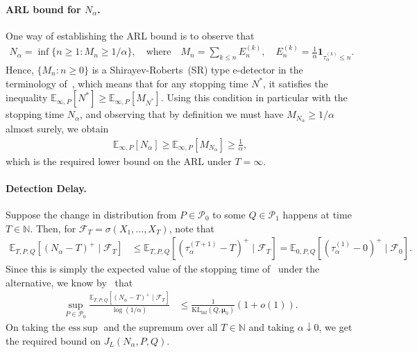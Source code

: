 \documentclass{article}
\theoremstyle{plain}
\theoremstyle{definition}
\newcommand{\KLinf}{\operatorname{KL_{inf}}}
\newcommand{\calP}{\mathcal P}
\newcommand{\calF}{\mathcal F}
\newcommand{\qtext}[1]{\quad \text{#1} \quad}
\newcommand{\boldmu}{\boldsymbol{\mu}}
\begin{document}
\paragraph{ARL bound for $N_\alpha$.} One way of establishing the ARL bound is to observe that 
\begin{align}
    N_\alpha = \inf \{n \geq 1: M_n \geq 1/\alpha\}, \qtext{where} M_n = \sum_{k \leq n} E_n^{(k)}, \quad E_n^{(k)} = \frac 1{\alpha} \boldsymbol{1}_{\tau_\alpha^{(k)} \leq n}. 
\end{align}
Hence, $\{M_n: n \geq 0\}$ is a  Shirayev-Roberts~(SR) type e-detector in the terminology of~\citet[Definition 2.6]{shin2023detectors}, which means that for any stopping time $N^*$, it satisfies the inequality $\mathbb{E}_{\infty, P}[N^*] \geq \mathbb{E}_{\infty, P}[M_{N^*}]$. Using this condition in particular with the stopping time $N_\alpha$, and observing that by definition we must have $M_{N_\alpha} \geq 1/\alpha$ almost surely, we obtain 
\begin{align}
    \mathbb{E}_{\infty, P}[N_\alpha] \geq \mathbb{E}_{\infty, P}[M_{N_\alpha}] \geq \frac 1{\alpha}, 
\end{align}
which is the required lower bound on the ARL under $T=\infty$. 


\paragraph{Detection Delay.} Suppose the change in distribution from $P \in \calP_0$ to some $Q \in \calP_1$ happens at time $T \in \mathbb{N}$. Then, for $\mathcal{F}_T = \sigma(X_1, \ldots, X_T)$, note that 
\begin{align}
    \mathbb{E}_{T, P, Q}[(N_\alpha - T)^+ \mid \calF_T] & \leq \mathbb{E}_{T,P,Q}[(\tau_\alpha^{(T+1)} - T)^+ \mid \calF_T] = \mathbb{E}_{0, P, Q}[(\tau_\alpha^{(1)} - 0)^+ \mid \calF_0]. 
\end{align}
Since this is simply the expected value of the stopping time of~ under the alternative, we know by~ that
\begin{align}
    \sup_{P \in \calP_0} \frac{\mathbb{E}_{T, P, Q}[(N_\alpha - T)^+ \mid \calF_T]}{\log(1/\alpha)} &\leq \frac{1}{\KLinf(Q, \boldmu_0)} \left( 1 + o(1) \right). 
\end{align}
On taking the $\mathrm{ess}\sup$ and the supremum over all $T \in \mathbb{N}$ and taking $\alpha \downarrow 0$, we get the required bound on $J_L(N_\alpha, P, Q)$. 
\end{document}
